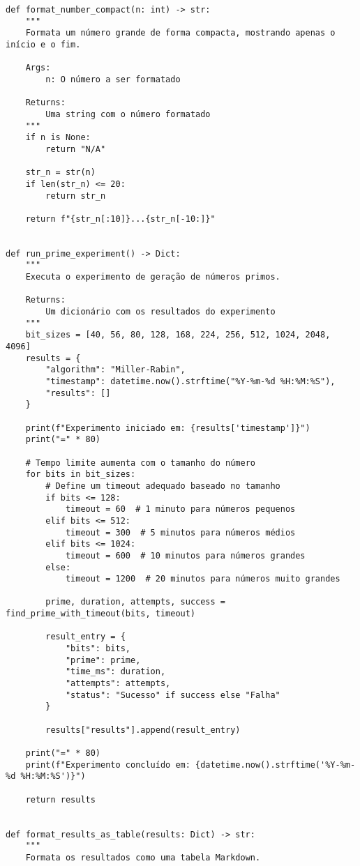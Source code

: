 \begin{verbatim}
def format_number_compact(n: int) -> str:
    """
    Formata um número grande de forma compacta, mostrando apenas o início e o fim.
    
    Args:
        n: O número a ser formatado
        
    Returns:
        Uma string com o número formatado
    """
    if n is None:
        return "N/A"
    
    str_n = str(n)
    if len(str_n) <= 20:
        return str_n
    
    return f"{str_n[:10]}...{str_n[-10:]}"


def run_prime_experiment() -> Dict:
    """
    Executa o experimento de geração de números primos.
    
    Returns:
        Um dicionário com os resultados do experimento
    """
    bit_sizes = [40, 56, 80, 128, 168, 224, 256, 512, 1024, 2048, 4096]
    results = {
        "algorithm": "Miller-Rabin",
        "timestamp": datetime.now().strftime("%Y-%m-%d %H:%M:%S"),
        "results": []
    }
    
    print(f"Experimento iniciado em: {results['timestamp']}")
    print("=" * 80)
    
    # Tempo limite aumenta com o tamanho do número
    for bits in bit_sizes:
        # Define um timeout adequado baseado no tamanho
        if bits <= 128:
            timeout = 60  # 1 minuto para números pequenos
        elif bits <= 512:
            timeout = 300  # 5 minutos para números médios
        elif bits <= 1024:
            timeout = 600  # 10 minutos para números grandes
        else:
            timeout = 1200  # 20 minutos para números muito grandes
        
        prime, duration, attempts, success = find_prime_with_timeout(bits, timeout)
        
        result_entry = {
            "bits": bits,
            "prime": prime,
            "time_ms": duration,
            "attempts": attempts,
            "status": "Sucesso" if success else "Falha"
        }
        
        results["results"].append(result_entry)
    
    print("=" * 80)
    print(f"Experimento concluído em: {datetime.now().strftime('%Y-%m-%d %H:%M:%S')}")
    
    return results


def format_results_as_table(results: Dict) -> str:
    """
    Formata os resultados como uma tabela Markdown.
    

\end{verbatim}
